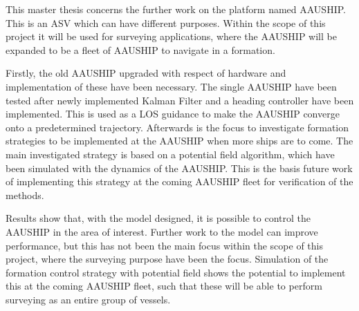 This master thesis concerns the further work on the platform named
AAUSHIP. This is an \acf{ASV} which can have different
purposes.  Within the scope of this project it will be used for
surveying applications, where the AAUSHIP will be expanded to be a
fleet of AAUSHIP to navigate in a formation.

Firstly, the old
AAUSHIP upgraded with respect of hardware and implementation of these
have been necessary. The single AAUSHIP have been tested after newly
implemented Kalman Filter and a heading controller have been
implemented. This is used as a \acf{LOS} guidance to make the AAUSHIP
converge onto a predetermined trajectory. Afterwards is the focus to
investigate formation strategies to be implemented at the AAUSHIP when
more ships are to come. The main investigated strategy is based on a
potential field algorithm, which have been simulated with the dynamics
of the AAUSHIP. This is the basis future work of implementing this
strategy at the coming AAUSHIP fleet for verification of the methods.

Results show that, with the model designed, it is possible to control
the AAUSHIP in the area of interest. Further work to the model can
improve performance, but this has not been the main focus within the
scope of this project, where the surveying purpose have been the
focus. Simulation of the formation control strategy with potential
field shows the potential to implement this at the coming AAUSHIP
fleet, such that these will be able to perform surveying as an entire
group of vessels.
